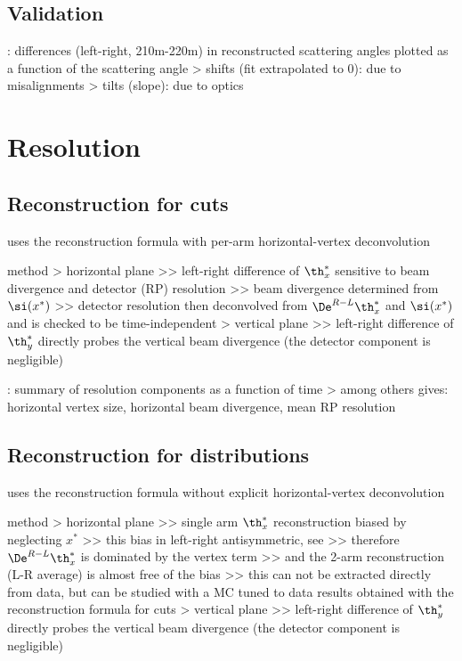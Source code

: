 \subsection{Validation}

\> : differences (left-right, 210m-220m) in reconstructed scattering angles plotted as a function of the scattering angle
\>> shifts (fit extrapolated to 0): due to misalignments
\>> tilts (slope): due to optics



\section{Resolution}

\subsection{Reconstruction for cuts}

\> uses the reconstruction formula with per-arm horizontal-vertex deconvolution

\> method
\>> horizontal plane
\>>> left-right difference of $\th_x^*$ sensitive to beam divergence and detector (RP) resolution
\>>> beam divergence determined from $\si(x^*)$
\>>> detector resolution then deconvolved from $\De^{R-L} \th_x^*$ and $\si(x^*)$ and is checked to be time-independent
\>> vertical plane
\>>> left-right difference of $\th_y^*$ directly probes the vertical beam divergence (the detector component is negligible)

\> : summary of resolution components as a function of time
\>> among others gives: horizontal vertex size, horizontal beam divergence, mean RP resolution

\subsection{Reconstruction for distributions}

\> uses the reconstruction formula without explicit horizontal-vertex deconvolution

\> method
\>> horizontal plane
\>>> single arm $\th_x^*$ reconstruction biased by neglecting $x^*$
\>>> this bias in left-right antisymmetric, see 
\>>> therefore $\De^{R-L} \th_x^*$ is dominated by the vertex term
\>>> and the 2-arm reconstruction (L-R average) is almost free of the bias
\>>> this can not be extracted directly from data, but can be studied with a MC tuned to data results obtained with the reconstruction formula for cuts
\>> vertical plane
\>>> left-right difference of $\th_y^*$ directly probes the vertical beam divergence (the detector component is negligible)

